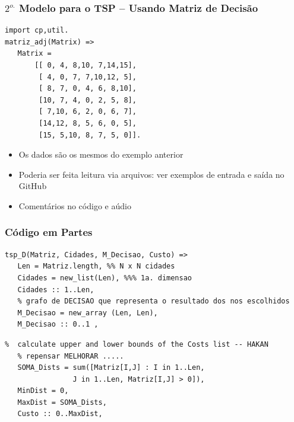 \begin{frame}[fragile]
\frametitle{$2^{o.}$ Modelo para o TSP -- Usando Matriz de Decisão}

\begin{footnotesize}
\begin{verbatim}
import cp,util.
matriz_adj(Matrix) =>
   Matrix = 
       [[ 0, 4, 8,10, 7,14,15],
        [ 4, 0, 7, 7,10,12, 5],
        [ 8, 7, 0, 4, 6, 8,10],
        [10, 7, 4, 0, 2, 5, 8],
        [ 7,10, 6, 2, 0, 6, 7],
        [14,12, 8, 5, 6, 0, 5],
        [15, 5,10, 8, 7, 5, 0]].
\end{verbatim}
\end{footnotesize}


\begin{itemize}
  \item Os dados são os mesmos do exemplo anterior
  \item Poderia ser feita leitura via arquivos: ver exemplos de entrada e saída no GitHub
  \item Comentários no código e aúdio
  \end{itemize}

\end{frame}

\begin{frame}[fragile] 

\frametitle{Código em Partes}

\begin{footnotesize}
\begin{verbatim}
tsp_D(Matriz, Cidades, M_Decisao, Custo) =>
   Len = Matriz.length, %% N x N cidades
   Cidades = new_list(Len), %%% 1a. dimensao
   Cidades :: 1..Len,
   % grafo de DECISAO que representa o resultado dos nos escolhidos
   M_Decisao = new_array (Len, Len),
   M_Decisao :: 0..1 ,
\end{verbatim}
\end{footnotesize}
\pause

\begin{footnotesize}
\begin{verbatim}
%  calculate upper and lower bounds of the Costs list -- HAKAN
   % repensar MELHORAR .....
   SOMA_Dists = sum([Matriz[I,J] : I in 1..Len, 
                J in 1..Len, Matriz[I,J] > 0]),
   MinDist = 0,
   MaxDist = SOMA_Dists,
   Custo :: 0..MaxDist,
\end{verbatim}
\end{footnotesize}    
    
\end{frame}


